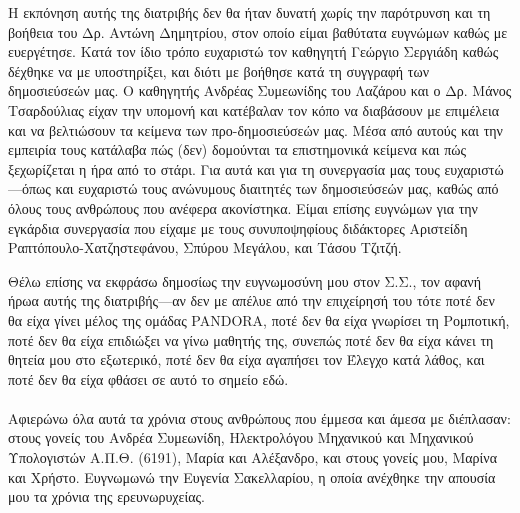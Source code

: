 
Η εκπόνηση αυτής της διατριβής δεν θα ήταν δυνατή χωρίς την παρότρυνση και τη
βοήθεια του Δρ. Αντώνη Δημητρίου, στον οποίο είμαι βαθύτατα ευγνώμων καθώς με
ευεργέτησε. Κατά τον ίδιο τρόπο ευχαριστώ τον καθηγητή Γεώργιο Σεργιάδη καθώς
δέχθηκε να με υποστηρίξει, και διότι με βοήθησε κατά τη συγγραφή των
δημοσιεύσεών μας. Ο καθηγητής Ανδρέας Συμεωνίδης του Λαζάρου και ο Δρ. Μάνος
Τσαρδούλιας είχαν την υπομονή και κατέβαλαν τον κόπο να διαβάσουν με επιμέλεια
και να βελτιώσουν τα κείμενα των προ-δημοσιεύσεών μας. Μέσα από αυτούς και την
εμπειρία τους κατάλαβα πώς (δεν) δομούνται τα επιστημονικά κείμενα και πώς
ξεχωρίζεται η ήρα από το στάρι. Για αυτά και για τη συνεργασία μας τους
ευχαριστώ---όπως και ευχαριστώ τους ανώνυμους διαιτητές των δημοσιεύσεών μας,
καθώς από όλους τους ανθρώπους που ανέφερα ακονίστηκα. Είμαι επίσης ευγνώμων
για την εγκάρδια συνεργασία που είχαμε με τους συνυποψηφίους διδάκτορες
Αριστείδη Ραπτόπουλο-Χατζηστεφάνου, Σπύρου Μεγάλου, και Τάσου Τζιτζή.

Θέλω επίσης να εκφράσω δημοσίως την ευγνωμοσύνη μου στον Σ.Σ., τον αφανή ήρωα
αυτής της διατριβής---αν δεν με απέλυε από την επιχείρησή του τότε ποτέ δεν θα
είχα γίνει μέλος της ομάδας PANDORA, ποτέ δεν θα είχα γνωρίσει τη Ρομποτική,
ποτέ δεν θα είχα επιδιώξει να γίνω μαθητής της, συνεπώς ποτέ δεν θα είχα κάνει
τη θητεία μου στο εξωτερικό, ποτέ δεν θα είχα αγαπήσει τον Έλεγχο κατά
λάθος, και ποτέ δεν θα είχα φθάσει σε αυτό το σημείο εδώ.  \\ \\

Αφιερώνω όλα αυτά τα χρόνια στους ανθρώπους που έμμεσα και άμεσα με διέπλασαν:
στους γονείς του Ανδρέα Συμεωνίδη, Ηλεκτρολόγου Μηχανικού και Μηχανικού
Υπολογιστών Α.Π.Θ. (6191), Μαρία και Αλέξανδρο, και στους γονείς μου, Μαρίνα και
Χρήστο. Ευγνωμωνώ την Ευγενία Σακελλαρίου, η οποία ανέχθηκε την απουσία μου τα
χρόνια της ερευνωρυχείας.

\afterpage{\blankpage}
\restoregeometry
\cleardoublepage
